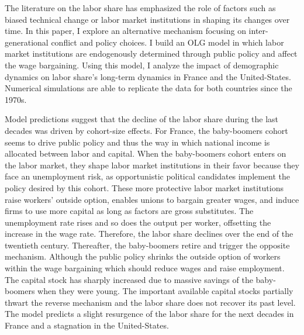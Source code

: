 The literature on the labor share has emphasized the role of factors such as biased technical change or labor market institutions in shaping its changes over time. 
In this paper, I explore an alternative mechanism focusing on inter-generational conflict and policy choices. 
I build an OLG model in which labor market institutions are endogenously determined through public policy and affect the wage bargaining. 
Using this model, I analyze the impact of demographic dynamics on labor share's long-term dynamics in France and the United-States. 
Numerical simulations are able to replicate the data for both countries since the 1970s.


Model predictions suggest that the decline of the labor share during the last decades was driven by cohort-size effects. 
For France, the baby-boomers cohort seems to drive public policy and thus the way in which national income is allocated between labor and capital.
When the baby-boomers cohort enters on the labor market, they shape labor market institutions in their favor because they face an unemployment risk, as opportunistic political candidates implement the policy desired by this cohort. 
These more protective labor market institutions raise workers' outside option, enables unions to bargain greater wages, and induce firms to use more capital as long as factors are gross substitutes.
The unemployment rate rises and so does the output per worker, offsetting the increase in the wage rate. 
Therefore, the labor share declines over the end of the twentieth century. 
Thereafter, the baby-boomers retire and trigger the opposite mechanism. 
Although the public policy shrinks the outside option of workers within the wage bargaining which should reduce wages and raise employment. 
The capital stock has sharply increased due to massive savings of the baby-boomers when they were young. 
The important available capital stocks partially thwart the reverse mechanism and the labor share does not recover its past level.
The model predicts a slight resurgence of the labor share for the next decades in France and a stagnation in the United-States.

